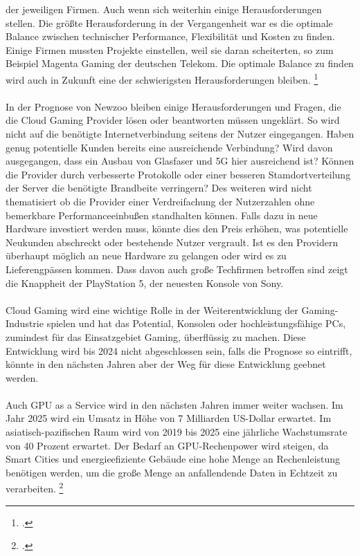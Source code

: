 \documentclass[12pt,toc=bib,toc=listof]{scrreprt}
\begin{document}
der jeweiligen Firmen. Auch wenn sich weiterhin einige Herausforderungen stellen. Die größte Herausforderung in der Vergangenheit war es 
die optimale Balance zwischen technischer Performance, Flexibilität und Kosten zu finden. Einige Firmen mussten Projekte einstellen, weil 
sie daran scheiterten, so zum Beispiel Magenta Gaming der deutschen Telekom. Die optimale Balance zu finden wird auch in Zukunft eine
der schwierigsten Herausforderungen bleiben. \footcite [Vgl.] [] {Fernandes.2022}
\\ \\
In der Prognose von Newzoo bleiben einige Herausforderungen und Fragen, die die Cloud Gaming Provider lösen 
oder beantworten müssen ungeklärt. So wird nicht auf die benötigte Internetverbindung seitens der Nutzer eingegangen.
Haben genug potentielle Kunden bereits eine ausreichende Verbindung? Wird davon ausgegangen, dass ein Ausbau von Glasfaser 
und 5G hier ausreichend ist? Können die Provider durch verbesserte Protokolle oder einer besseren Stamdortverteilung 
der Server die benötigte Brandbeite verringern? Des weiteren wird nicht thematisiert ob die Provider einer Verdreifachung 
der Nutzerzahlen ohne bemerkbare Performanceeinbußen standhalten können. Falls dazu in neue Hardware investiert werden muss, 
könnte dies den Preis erhöhen, was potentielle Neukunden abschreckt oder bestehende Nutzer vergrault. Ist es den Providern 
überhaupt möglich an neue Hardware zu gelangen oder wird es zu Lieferengpässen kommen. Dass davon auch große Techfirmen
betroffen sind zeigt die Knappheit der PlayStation 5, der neuesten Konsole von Sony.
\\ \\
Cloud Gaming wird eine wichtige Rolle in der Weiterentwicklung der Gaming-Industrie spielen und hat das Potential, 
Konsolen oder hochleistungsfähige PCs, zumindest für das Einsatzgebiet Gaming, überflüssig zu machen. Diese Entwicklung 
wird bis 2024 nicht abgeschlossen sein, falls die Prognose so eintrifft, könnte in den nächsten Jahren aber der Weg 
für diese Entwicklung geebnet werden.
\\ \\
Auch GPU as a Service wird in den nächsten Jahren immer weiter wachsen. Im Jahr 2025 wird ein Umsatz in Höhe von 7 Milliarden US-Dollar erwartet. 
Im asiatisch-pazifischen Raum wird von 2019 bis 2025 eine jährliche Wachstumsrate von 40 Prozent erwartet. Der Bedarf an GPU-Rechenpower wird steigen, 
da Smart Cities und energieefiziente Gebäude eine hohe Menge an Rechenleistung benötigen werden, um die große Menge an anfallendende Daten in Echtzeit
zu verarbeiten. \footcite [Vgl.] [] {Jadhav.2020}
\end{document}
